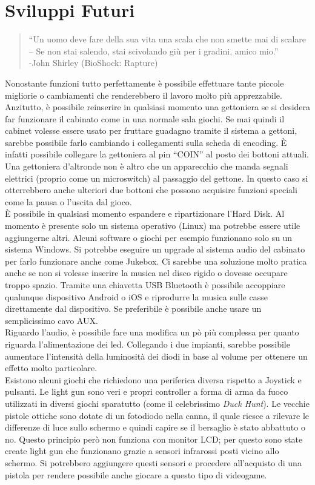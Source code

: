\section{Sviluppi Futuri}
\begin{quotation}\small
“Un uomo deve fare della sua vita una scala che non smette mai di scalare -- Se non stai salendo, stai scivolando giù per i gradini, amico mio.”\\-John Shirley (BioShock: Rapture)
\end{quotation}
 Nonostante funzioni tutto perfettamente è possibile effettuare tante piccole migliorie o cambiamenti che renderebbero il lavoro molto più apprezzabile. Anzitutto, è possibile reinserire in qualsiasi momento una gettoniera se si desidera far funzionare il cabinato come in una normale sala giochi. Se mai quindi il cabinet volesse essere usato per fruttare guadagno tramite il sistema a gettoni, sarebbe possibile farlo cambiando i collegamenti sulla scheda di encoding. È infatti possibile collegare la gettoniera al pin “COIN” al posto dei bottoni attuali. Una gettoniera d’altronde non è altro che un apparecchio che manda segnali elettrici (proprio come un microswitch) al passaggio del gettone. In questo caso si otterrebbero anche ulteriori due bottoni che possono acquisire funzioni speciali come la pausa o l’uscita dal gioco.\\È possibile in qualsiasi momento espandere e ripartizionare l’Hard Disk. Al momento è presente solo un sistema operativo (Linux) ma potrebbe essere utile aggiungerne altri. Alcuni software o giochi per esempio funzionano solo su un sistema Windows. Si potrebbe eseguire un upgrade al sistema audio del cabinato per farlo funzionare anche come Jukebox. Ci sarebbe una soluzione molto pratica anche se non si volesse inserire la musica nel disco rigido o dovesse occupare troppo spazio. Tramite una chiavetta USB Bluetooth è possibile accoppiare qualunque dispositivo Android o iOS e riprodurre la musica sulle casse direttamente dal dispositivo. Se preferibile è possibile anche usare un semplicissimo cavo AUX.\\
Riguardo l’audio, è possibile fare una modifica un pò più complessa per quanto riguarda l’alimentazione dei led. Collegando i due impianti, sarebbe possibile aumentare l’intensità della luminosità dei diodi in base al volume per ottenere un effetto molto particolare.\\Esistono alcuni giochi che richiedono una periferica diversa rispetto a Joystick e pulsanti. Le light gun sono veri e propri controller a forma di arma da fuoco utilizzati in diversi giochi sparatutto (come il celebrissimo\textit{ Duck Hunt}). Le vecchie pistole ottiche sono dotate di un fotodiodo nella canna, il quale riesce a rilevare le differenze di luce sullo schermo e quindi capire se il bersaglio è stato abbattuto o no. Questo principio però non funziona con monitor LCD; per questo sono state create light gun che funzionano grazie a sensori infrarossi posti vicino allo schermo. Si potrebbero aggiungere questi sensori e procedere all’acquisto di una pistola per rendere possibile anche giocare a questo tipo di videogame.

